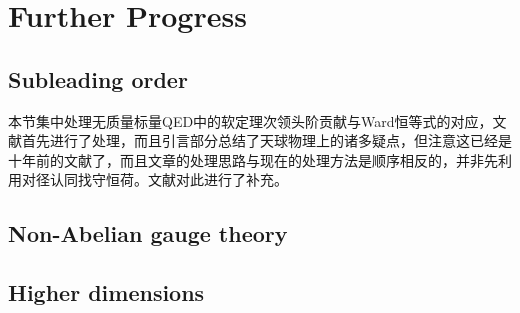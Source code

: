 \section{Further Progress}
\subsection{Subleading order}
本节集中处理无质量标量QED中的软定理次领头阶贡献与Ward恒等式的对应，文献\cite{Lysov:2014csa}首先进行了处理，而且引言部分总结了天球物理上的诸多疑点，但注意这已经是十年前的文献了，而且文章的处理思路与现在的处理方法是顺序相反的，并非先利用对径认同找守恒荷。文献\cite{Campiglia:2016hvg}对此进行了补充。
\subsection{Non-Abelian gauge theory}
\subsection{Higher dimensions}



